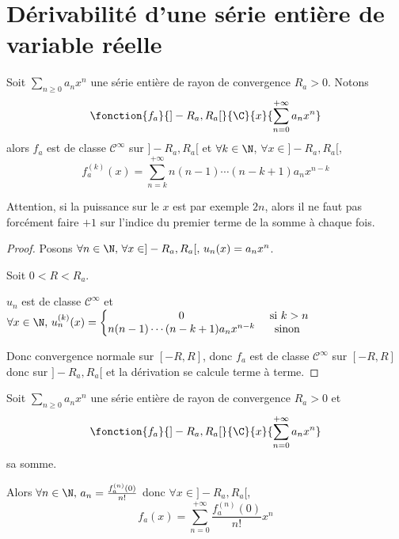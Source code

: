 \section{Dérivabilité d'une série entière de variable réelle }


\lvspace \avspace \begin{theoreme}{}{}
    Soit $\sum_{n \geqslant 0} a_n x^n$ une série entière de rayon de convergence $R_a > 0$.
    Notons $$\fonction{f_a}{]-R_a, R_a[}{\C}{x}{\sum_{n = 0}^{+\infty} a_n x^n}$$ alors 
    $f_a$ est de classe $\mathscr {C}^\infty$ sur $]-R_a, R_a[$ et 
    $\forall k \in \N$, $\forall x \in ]-R_a, R_a[$,
    $$f^{(k)}_a(x) = \sum_{n = k}^{+\infty} n (n - 1) \cdots (n - k + 1) a_n x^{n - k}$$
\end{theoreme}


\begin{remarque}
    Attention, si la puissance sur le $x$ est par exemple $2n$, alors il ne faut pas forcément 
    faire $+1$ sur l'indice du premier terme de la somme à chaque fois. 
\end{remarque}

\begin{proof}
    Posons $\forall n \in \N, \, \forall x \in ]-R_a, R_a[, \, u_n(x) = a_n x^n$.

    Soit $0 < R < R_a$. 

    $u_n $ est de classe $\mathscr {C}^\infty$ et $\forall x \in \N, \, u_n^{(k)}(x) = \left\{ \begin{matrix}
        0 & \text{ si } k > n \\
        n(n- 1) \cdots (n - k + 1) a_n x^{n - k} & \text{ sinon }
    \end{matrix} \right.$ 

    Donc convergence normale sur $[-R, R]$, donc $f_a$ est de classe $\mathscr {C}^\infty$ 
    sur $[-R, R]$ donc sur $]-R_a, R_a[$ et la dérivation se calcule terme à terme.
\end{proof}

\begin{corollaire}{}{}
    Soit $\sum_{n \geqslant 0} a_n x^n$ une série entière de rayon de convergence $R_a > 0$ 
    et $$\fonction{f_a}{]-R_a, R_a[}{\C}{x}{\sum_{n = 0}^{+\infty} a_n x^n}$$ sa somme. 

    Alors $\forall n \in \N, \, a_n = \frac{f_a^{(n)}(0)}{n!}$ donc 
    $\forall x \in ]-R_a, R_a[$, 
    $$f_a(x) = \sum_{n = 0}^{+\infty} \frac{f_a^{(n)}(0)}{n!} x^n$$
\end{corollaire}

